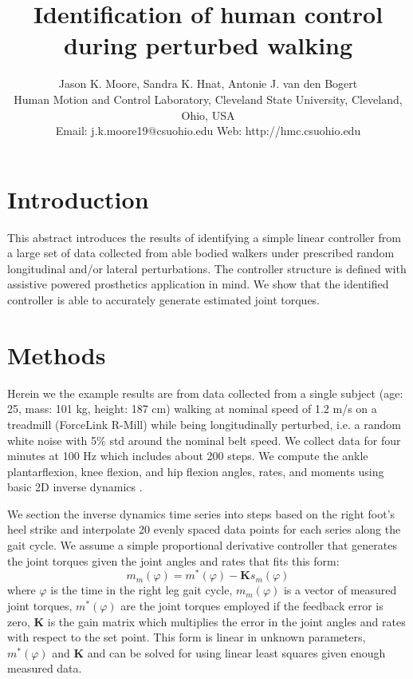 \documentclass[10pt,letterpaper,notitlepage,twocolumn]{article}
\title{Identification of human control during perturbed walking}
\author{
  Jason K. Moore, Sandra K. Hnat, Antonie J. van den Bogert\\
  Human Motion and Control Laboratory, Cleveland State University, Cleveland, Ohio, USA\\
  Email: j.k.moore19@csuohio.edu Web: http://hmc.csuohio.edu
}
\date{}
\begin{document}

\maketitle

\section*{Introduction}
%
This abstract introduces the results of identifying a simple linear controller
from a large set of data collected from able bodied walkers under prescribed
random longitudinal and/or lateral perturbations. The controller structure is
defined with assistive powered prosthetics application in mind. We show that
the identified controller is able to accurately generate estimated joint
torques.
%
\section*{Methods}
%
Herein we the example results are from data collected from a single subject
(age: 25, mass: 101 kg, height: 187 cm) walking at nominal speed of 1.2 m/s on
a treadmill (ForceLink R-Mill) while being longitudinally perturbed, i.e. a
random white noise with 5\% std around the nominal belt speed. We collect data
for four minutes at 100 Hz which includes about 200 steps. We compute the
ankle plantarflexion, knee flexion, and hip flexion angles, rates, and moments
using basic 2D inverse dynamics \cite{Winter}. %

We section the inverse dynamics time series into steps based on the right
foot's heel strike and interpolate 20 evenly spaced data points for each series
along the gait cycle. We assume a simple proportional derivative controller
that generates the joint torques given the joint angles and rates that fits
this form:
%
\begin{equation}
  m_m(\varphi) = m^*(\varphi) - \mathbf{K}s_m(\varphi)
\end{equation}
%
where $\varphi$ is the time in the right leg gait cycle, $m_m(\varphi)$ is a
vector of measured joint torques, $m^*(\varphi)$ are the joint torques employed
if the feedback error is zero, $\mathbf{K}$ is the gain matrix which multiplies
the error in the joint angles and rates with respect to the set point. This
form is linear in unknown parameters, $m^*(\varphi)$ and $\mathbf{K}$ and can
be solved for using linear least squares given enough measured data.
%
\end{document}
